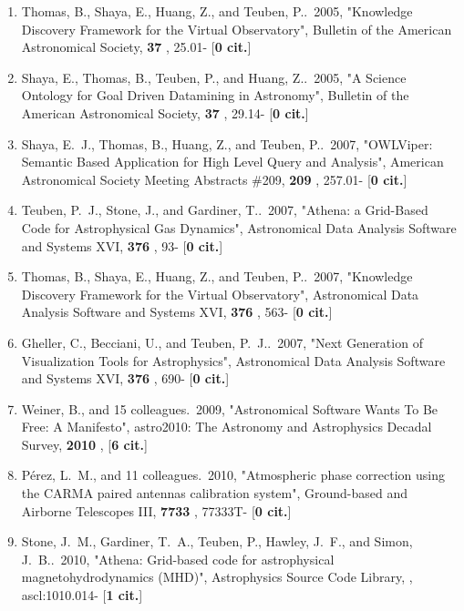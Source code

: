\documentclass[11pt,letterpaper]{article}
\begin{document}
\begin{enumerate}[resume,label=\textbf{\arabic*}.]
\item  
Thomas, B., Shaya, E., Huang, Z., and Teuben, P..\  2005,  "Knowledge 
Discovery Framework for the Virtual Observatory", Bulletin of the American 
Astronomical Society,  {\bf 37} , 25.01- [{\bf 0 cit.}] 

\item  
Shaya, E., Thomas, B., Teuben, P., and Huang, Z..\  2005,  "A Science 
Ontology for Goal Driven Datamining in Astronomy", Bulletin of the American 
Astronomical Society,  {\bf 37} , 29.14- [{\bf 0 cit.}] 

\item  
Shaya, E.~J., Thomas, B., Huang, Z., and Teuben, P..\  2007,  "OWLViper: 
Semantic Based Application for High Level Query and Analysis", American 
Astronomical Society Meeting Abstracts \#209,  {\bf 209} , 257.01- [{\bf 0 
cit.}] 

\item  
Teuben, P.~J., Stone, J., and Gardiner, T..\  2007,  "Athena: a Grid-Based 
Code for Astrophysical Gas Dynamics", Astronomical Data Analysis Software 
and Systems XVI,  {\bf 376} , 93- [{\bf 0 cit.}] 

\item  
Thomas, B., Shaya, E., Huang, Z., and Teuben, P..\  2007,  "Knowledge 
Discovery Framework for the Virtual Observatory", Astronomical Data 
Analysis Software and Systems XVI,  {\bf 376} , 563- [{\bf 0 cit.}] 

\item  
Gheller, C., Becciani, U., and Teuben, P.~J..\  2007,  "Next Generation of 
Visualization Tools for Astrophysics", Astronomical Data Analysis Software 
and Systems XVI,  {\bf 376} , 690- [{\bf 0 cit.}] 

\item  
Weiner, B., and 15 colleagues.\  2009,  "Astronomical Software Wants To Be 
Free: A Manifesto", astro2010: The Astronomy and Astrophysics Decadal 
Survey,  {\bf 2010} ,  [{\bf 6 cit.}] 


\item  
P{\'e}rez, L.~M., and 11 colleagues.\  2010,  "Atmospheric phase correction 
using the CARMA paired antennas calibration system", Ground-based and 
Airborne Telescopes III,  {\bf 7733} , 77333T- [{\bf 0 cit.}] 

\item  
Stone, J.~M., Gardiner, T.~A., Teuben, P., Hawley, J.~F., and Simon, 
J.~B..\  2010,  "Athena: Grid-based code for astrophysical 
magnetohydrodynamics (MHD)", Astrophysics Source Code Library,  , 
ascl:1010.014- [{\bf 1 cit.}] 


\end{enumerate}
\end{document}
